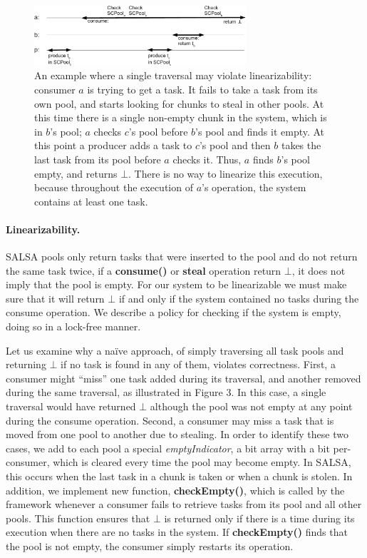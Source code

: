 \begin{figure}[htb]
	\centering
	\includegraphics[width=0.7\textwidth]{figures/linearizability-example}
	\caption{\footnotesize{An example where a single traversal may violate linearizability: consumer $a$ is trying to get a task. It fails to take a task from its own pool, and starts looking for chunks to steal in other pools. At this time there is a single non-empty chunk in the system, which is in $b$'s pool; $a$ checks $c$'s pool before $b$'s pool and finds it empty. At this point a producer adds a task to $c$'s pool and then $b$ takes the last task from its pool before $a$ checks it. Thus, $a$ finds $b$'s pool empty, and returns $\bot$. There is no way to linearize this execution, because throughout the execution of $a$'s operation, the system contains at least one task.}}
	\label{fig:linearizability-example}
\end{figure}

\paragraph{Linearizability.}
SALSA pools only return tasks that were inserted to the pool and do not return the same task twice, if a {\bf consume()} or {\bf steal} operation return $\bot$, it does not imply that the pool is empty. For our system to be linearizable we must make sure that it will return $\bot$ if and only if the system contained no tasks during the consume operation. We describe a policy for checking if the system is empty, doing so in a lock-free manner. 

Let us examine why a na\"ive approach, of simply traversing all task pools and returning $\bot$ if no task is found in any of them, violates correctness. First, a consumer might ``miss'' one task added during its traversal, and another removed during the same traversal, as illustrated in Figure 3. In this case, a single traversal would have returned $\bot$ although the pool was not empty at any point during the consume operation. Second, a consumer may miss a task that is moved from one pool to another due to stealing. In order to identify these two cases, we add to each pool a special \emph{emptyIndicator}, a bit array with a bit per-consumer, which is cleared every time the pool may become empty. In SALSA, this occurs when the last task in a chunk is taken or when a chunk is stolen. 
In addition, we implement new function, {\bf checkEmpty()}, which is called by the framework whenever a consumer fails to retrieve tasks from its pool and all other pools. This function ensures that $\bot$ is returned only if there is a time during its execution when there are no tasks in the system. If {\bf checkEmpty()} finds that the pool is not empty, the consumer simply restarts its operation. 

